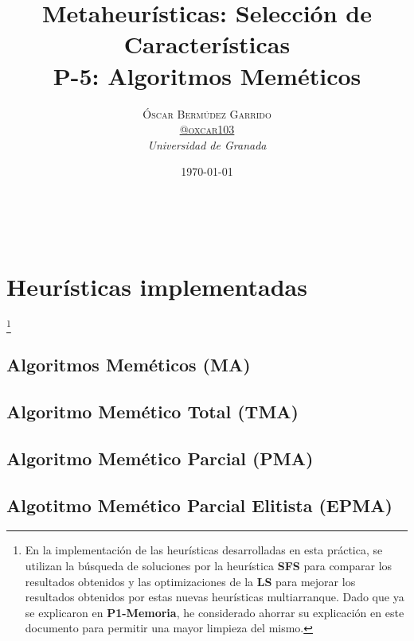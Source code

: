 \documentclass[a4paper, 11pt]{article}
\title{\textbf{Metaheurísticas: Selección de Características}\\ %
P-5: Algoritmos Meméticos} %
\author{\textsc{Óscar Bermúdez Garrido\\
\href{http://www.github.com/oxcar103}{@oxcar103}} %
\\{\textit{Universidad de Granada}}} %
\date{\today} %
\makeatletter
\renewcommand{\maketitle}{
  \begin{flushright} %
  {\LARGE\@title} %
  
  \vspace{50pt} %
  
  {\large\@author} %
  \\\@date %
  \vspace{40pt} %
  \end{flushright}
}
\makeatother
\begin{document}
\maketitle %

\renewcommand{\abstractname}{Resumen} %



{\parskip=2pt
  \tableofcontents
}
\pagebreak

	
	
	
	\section{Heurísticas implementadas}\footnote{En la implementación de las heurísticas desarrolladas
	en esta práctica, se utilizan la búsqueda de soluciones por la heurística \textbf{SFS} para comparar
	los resultados obtenidos y las optimizaciones de la \textbf{LS} para mejorar los resultados obtenidos
	por estas nuevas heurísticas multiarranque. Dado que ya se explicaron en \textbf{P1-Memoria}, he
	considerado ahorrar su explicación en este documento para permitir una mayor limpieza del mismo.}
	
		\subsection{Algoritmos Meméticos (\textbf{MA})}
		\subsection{Algoritmo Memético Total (\textbf{TMA})}
		\subsection{Algoritmo Memético Parcial (\textbf{PMA})}
		\subsection{Algotitmo Memético Parcial Elitista (\textbf{EPMA})}
	
\end{document}
